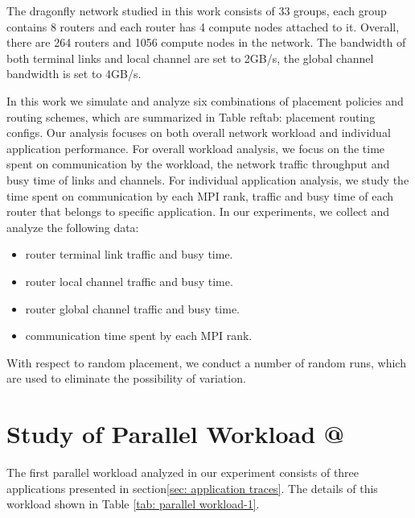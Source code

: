 \documentclass[conference,compsoc]{IEEEtran}
\makeatletter
\newcommand{\Rmnum}[1]{\expandafter\@slowromancap\romannumeral #1@}
\makeatother
\begin{document}
The dragonfly network studied in this work consists of 33 groups, each group contains 8 routers and each router has 4 compute nodes attached to it. Overall, there are 264 routers and 1056 compute nodes in the network. The bandwidth of both terminal links and local channel are set to 2GB/s, the global channel bandwidth is set to 4GB/s. 

In this work we simulate and analyze six combinations of placement policies and routing schemes, which are summarized in Table ref{tab: placement routing configs}. Our analysis focuses on both overall network workload and individual application performance. For overall workload analysis, we focus on the time spent on communication by the workload, the network traffic throughput and busy time of links and channels. For individual application analysis, we study the time spent on communication by each MPI rank, traffic and busy time of each router that belongs to specific application. In our experiments, we collect and analyze the following data: 

\begin{itemize}
    \item router terminal link traffic and busy time.
    \item router local channel traffic and busy time.
    \item router global channel traffic and busy time.
    \item communication time spent by each MPI rank. 
\end{itemize}

With respect to random placement, we conduct a number of random runs, which are used to eliminate the possibility of variation.

%


\section{Study of Parallel Workload \Rmnum{1 }}
\label{sec:workload-1}

The first parallel workload analyzed in our experiment consists of three applications presented in section\ref{sec: application traces}. The details of this workload shown in Table \ref{tab: parallel workload-1}.
\end{document}
